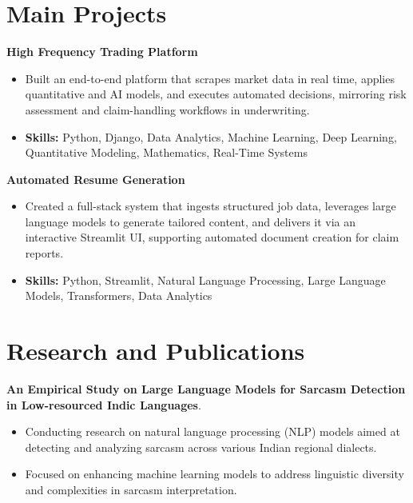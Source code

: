 \documentclass[a4paper,11pt]{article}
\begin{document}
\section{\textbf{Main Projects}}

\vspace{1mm}
  \textbf{High Frequency Trading Platform  }
\vspace{-1.5mm} %
\begin{itemize}
  \item Built an end-to-end platform that scrapes market data in real time, applies quantitative and AI models, and executes automated decisions, mirroring risk assessment and claim-handling workflows in underwriting.
\vspace{-3mm}
  \item \textbf{Skills:} Python, Django, Data Analytics, Machine Learning, Deep Learning, Quantitative Modeling, Mathematics, Real-Time Systems
\end{itemize}


\vspace{1mm}
   \textbf{Automated Resume Generation }
\vspace{-1.5mm} %
\begin{itemize}
  \item Created a full-stack system that ingests structured job data, leverages large language models to generate tailored content, and delivers it via an interactive Streamlit UI, supporting automated document creation for claim reports.
\vspace{-3mm}
  \item \textbf{Skills:} Python, Streamlit, Natural Language Processing, Large Language Models, Transformers, Data Analytics
\end{itemize}



\section{\textbf{Research and Publications} \hfill }
\vspace{1mm}
  \textbf{An Empirical Study on Large Language Models for Sarcasm Detection in Low-resourced Indic Languages}.
\vspace{-1mm} %
\begin{itemize}
  \item Conducting research on natural language processing (NLP) models aimed at detecting and analyzing sarcasm across various Indian regional dialects.
\vspace{-3mm}
  \item Focused on enhancing machine learning models to address linguistic diversity and complexities in sarcasm interpretation.
\end{itemize}
\end{document}
